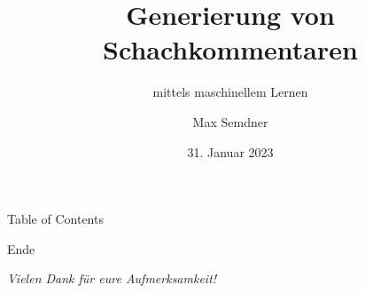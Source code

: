 \documentclass[aspectratio=169,xcolor=dvipsnames,pdf]{beamer}
\title{Generierung von Schachkommentaren}
\subtitle{mittels maschinellem Lernen}
\author{Max Semdner}
\institute{Frankfurt University of Applied Sciences}
\date{31. Januar 2023}
\begin{document}
\begin{frame}
\titlepage
\end{frame}

\begin{frame}{Table of Contents}
\tableofcontents
\end{frame}









\begin{frame}{Ende}
\begin{center}
\begin{large}
\textit{Vielen Dank für eure Aufmerksamkeit!}
\end{large}
\end{center}
\end{frame}
\end{document}
